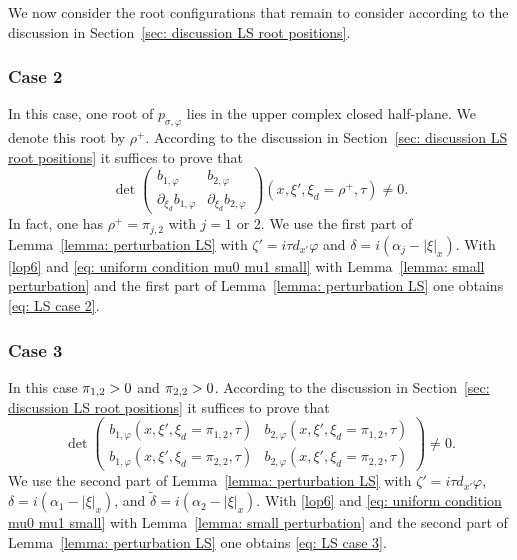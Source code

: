 \documentclass[JEP,XML,SOM,Unicode,published]{cedram}
\theoremstyle{plain}
\theoremstyle{definition}
\let \Im \relax
\DeclareMathOperator{\Im}{Im}
\newcommand{\pconj}{p_{\sigma,\varphi}}
\begin{document}
We now consider the root configurations that remain to consider
according to the discussion in Section~\ref{sec: discussion LS root
positions}.

\subsubsection*{Case 2}
In this case, one root of $\pconj$ lies in the upper complex closed
half-plane. We denote this root by $\rho^+$. According to the
discussion in Section~\ref{sec: discussion LS root positions} it
suffices to prove that
\begin{equation}
\label{eq: LS case 2}
\det
\begin{pmatrix}
b_{1,\varphi} &b_{2,\varphi}\\[
2pt]
\partial_{\xi_d}b_{1,\varphi}& \partial_{\xi_d}b_{2,\varphi}
\end{pmatrix}(x,\xi',\xi_d=\rho^+,\tau) \neq 0.
\end{equation}
In fact, one has $\rho^+ = \pi_{j,2}$ with $j=1$ or $2$. We use
the first part of Lemma~\ref{lemma: perturbation LS} with
$\zeta' = i \tau d_{x'} \varphi$ and
$\delta = i (\alpha_j - |\xi|_x)$. With \eqref{lop6} and \eqref{eq:
uniform condition mu0 mu1 small} with Lemma~\ref{lemma: small
perturbation} and the first part of Lemma~\ref{lemma: perturbation
LS} one obtains \eqref{eq: LS case 2}.

\subsubsection*{Case 3}
In this case $\Im \pi_{1,2}>0$ and $\Im \pi_{2,2} >0$. According to the
discussion in Section~\ref{sec: discussion LS root positions} it
suffices to prove that
\begin{equation}\label{eq: LS case 3}
\det
\begin{pmatrix}
b_{1,\varphi}(x,\xi',\xi_d=\pi_{1,2},\tau) & b_{2,\varphi}(x,\xi',\xi_d=\pi_{1,2},\tau) \\[
4pt]
b_{1,\varphi}(x,\xi',\xi_d=\pi_{2,2},\tau) & b_{2,\varphi}(x,\xi',\xi_d=\pi_{2,2},\tau)
\end{pmatrix}\neq 0.
\end{equation}
We use the second part of
Lemma~\ref{lemma: perturbation LS} with
$\zeta' = i \tau d_{x'} \varphi$,
$\delta = i (\alpha_1 - |\xi|_x)$, and $\tilde{\delta} = i (\alpha_2 - |\xi|_x)$. With \eqref{lop6} and \eqref{eq:
uniform condition mu0 mu1 small} with Lemma~\ref{lemma: small
perturbation} and the second part of Lemma~\ref{lemma: perturbation
LS} one obtains \eqref{eq: LS case 3}.
\end{document}
